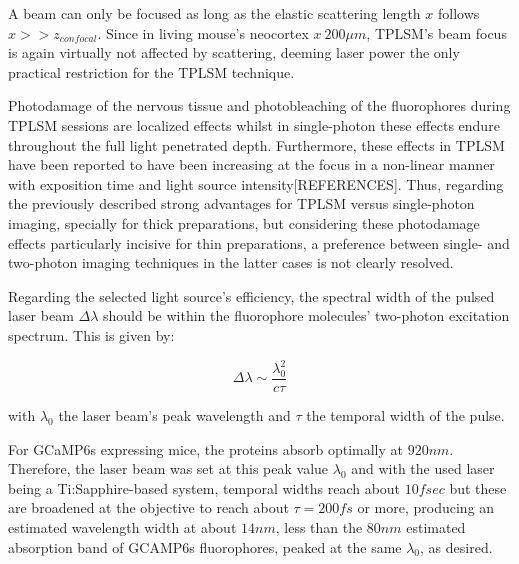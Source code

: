 A beam can only be focused as long as the elastic scattering length $x$ follows $x >> z_{confocal}$. Since in living mouse's neocortex $x ~ 200 \mu m$, TPLSM's beam focus is again virtually not affected by scattering, deeming laser power the only practical restriction for the TPLSM technique.

Photodamage of the nervous tissue and photobleaching of the fluorophores during TPLSM sessions are localized effects whilst in single-photon these effects endure throughout the full light penetrated depth. Furthermore, these effects in TPLSM have been reported to have been increasing at the focus in a non-linear manner with exposition time and light source intensity[REFERENCES]. Thus, regarding the previously described strong advantages for TPLSM versus single-photon imaging, specially for thick preparations, but considering these photodamage effects particularly incisive for thin preparations, a preference between single- and two-photon imaging techniques in the latter cases is not clearly resolved.

Regarding the selected light source's efficiency, the spectral width of the pulsed laser beam $\Delta \lambda$ should be within the fluorophore molecules' two-photon excitation spectrum. This is given by:

\begin{equation}
\Delta \lambda \sim \dfrac{\lambda_0 ^2}{c \tau}
\end{equation} 

with $\lambda_0$ the laser beam's peak wavelength and $\tau$ the temporal width of the pulse. 

For GCaMP6s expressing mice, the proteins absorb optimally at $920 nm$. Therefore, the laser beam was set at this peak value $\lambda_0$ and with the used laser being a Ti:Sapphire-based system, temporal widths reach about $10 fsec$ but these are broadened at the objective to reach about $\tau=200 fs$ or more, producing an estimated wavelength width at about $14 nm$, less than the $80 nm$ estimated absorption band of GCAMP6s fluorophores, peaked at the same $\lambda_0$, as desired.
